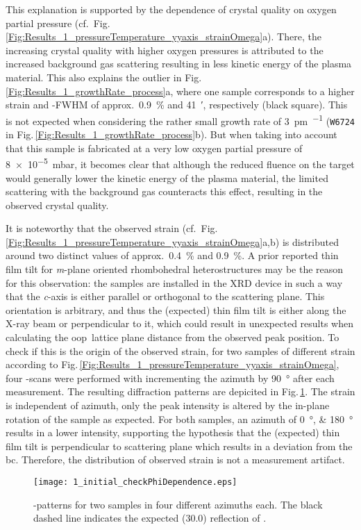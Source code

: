 This explanation is supported by the dependence of crystal quality on oxygen partial pressure (cf.\ Fig.\,\ref{Fig:Results_1_pressureTemperature_yyaxis_strainOmega}a).
There, the increasing crystal quality with higher oxygen pressures is attributed to the increased background gas scattering resulting in less kinetic energy of the plasma material.
This also explains the outlier in Fig.\,\ref{Fig:Results_1_growthRate_process}a, where one sample corresponds to a higher strain and \textomega-FWHM of approx.\ \qty{0.9}{\percent} and \qty{41}{\arcminute}, respectively (black square).
This is not expected when considering the rather small growth rate of \qty{3}{\pm\per\pulse} (\texttt{W6724} in Fig.\,\ref{Fig:Results_1_growthRate_process}b).
But when taking into account that this sample is fabricated at a very low oxygen partial pressure of \qty{8e-5}{\milli\bar}, it becomes clear that although the reduced fluence on the target would generally lower the kinetic energy of the plasma material, the limited scattering with the background gas counteracts this effect, resulting in the observed crystal quality.

It is noteworthy that the observed strain (cf.\ Fig.\,\ref{Fig:Results_1_pressureTemperature_yyaxis_strainOmega}a,b) is distributed around two distinct values of approx.\ \qty{0.4}{\percent} and \qty{0.9}{\percent}.
A prior reported thin film tilt for \textit{m}-plane oriented rhombohedral heterostructures
    \cite{kneiss2021}
may be the reason for this observation:
the samples are installed in the XRD device in such a way that the \textit{c}-axis is either parallel or orthogonal to the scattering plane.
This orientation is arbitrary, and thus the (expected) thin film tilt is either along the X-ray beam or perpendicular to it, which could result in unexpected results when calculating the \gls{oop}\ lattice plane distance from the observed peak position.
To check if this is the origin of the observed strain, for two samples of different strain according to Fig.\,\ref{Fig:Results_1_pressureTemperature_yyaxis_strainOmega}, four \thetaomega-scans were performed with incrementing the azimuth by \qty{90}{\degree} after each measurement.
The resulting diffraction patterns are depicited in Fig.\,\ref{Fig:Results_1_checkPhi}.
The strain is independent of azimuth, only the peak intensity is altered by the in-plane rotation of the sample as expected.
For both samples, an azimuth of \qtylist{0;180}{\degree} results in a lower intensity, supporting the hypothesis that the (expected) thin film tilt is perpendicular to scattering plane which results in a deviation from the \gls{bc}.
Therefore, the distribution of observed strain is not a measurement artifact.
\begin{figure}
    \centering
    \texttt{[image: 1\_initial\_checkPhiDependence.eps]}
    \caption{
        \thetaomega-patterns for two samples in four different azimuths each.
        The black dashed line indicates the expected (30.0) reflection of \cro.
        }
    \label{Fig:Results_1_checkPhi}
\end{figure}
